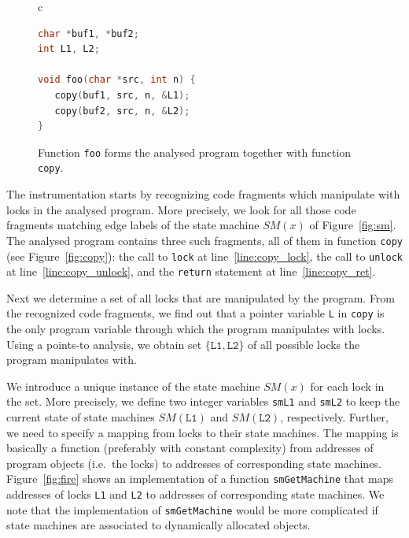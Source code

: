 \documentclass[10pt]{llncs}
\newcommand{\SM}{{\textit{SM}}}
\begin{document}
\begin{figure}[htb]
  \centering
  \begin{tabular}{c}
    \begin{lstlisting}[language=C]
char *buf1, *buf2;
int L1, L2;

void foo(char *src, int n) {
   copy(buf1, src, n, &L1);
   copy(buf2, src, n, &L2);
}
    \end{lstlisting}
  \end{tabular}
  \caption{Function \texttt{foo} forms the analysed program together
    with function \texttt{copy}.}
  \label{fig:foo}
\end{figure}

The instrumentation starts by recognizing code fragments which manipulate with
locks in the analysed program. More precisely, we look for all those code
fragments matching edge labels of the state machine $\SM(x)$ of
Figure~\ref{fig:sm}. The analysed program contains three such fragments, all
of them in function \texttt{copy} (see Figure~\ref{fig:copy}): the call to
\texttt{lock} at line~\ref{line:copy_lock}, the call to \texttt{unlock} at
line~\ref{line:copy_unlock}, and the \texttt{return} statement at
line~\ref{line:copy_ret}.

Next we determine a set of all locks that are manipulated by the program.
From the recognized code fragments, we find out that a pointer variable
\texttt{L} in \texttt{copy} is the only program variable through which the
program manipulates with locks.  Using a points-to analysis, we obtain set
$\{ \texttt{L1}, \texttt{L2} \}$ of all possible locks the program manipulates
with.

We introduce a unique instance of the state machine $\SM(x)$ for each lock in
the set. More precisely, we define two integer variables \texttt{smL1} and
\texttt{smL2} to keep the current state of state machines $\SM(\texttt{L1})$
and $\SM(\texttt{L2})$, respectively. Further, we need to specify a mapping
from locks to their state machines. The mapping is basically a function
(preferably with constant complexity) from addresses of program objects
(i.e.~the locks) to addresses of corresponding state machines.
Figure~\ref{fig:fire} shows an implementation of a function
\texttt{smGetMachine} that maps addresses of locks \texttt{L1} and
\texttt{L2} to addresses of corresponding state machines. We note that the
implementation of \texttt{smGetMachine} would be more complicated if state
machines are associated to dynamically allocated objects.

\end{document}
